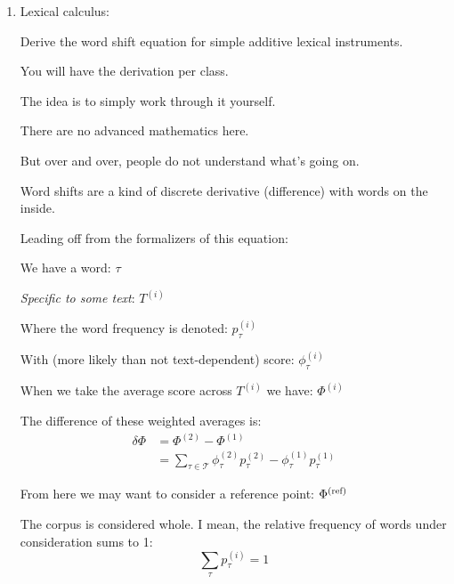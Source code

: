 \begin{enumerate}
(e):

For any \sout{non-isometric} general allometric scaling we will have more surface area per volume than our isometric counterparts.

Simply put:

$\gamma_3 \leq \frac{1}{3} \Rightarrow S \to$ bigger, faster. 

$\gamma_3 = \gamma_2 = \gamma_1 = \frac{1}{3}\Rightarrow S \to$  bigger, slowest.

$\gamma_3 =0 \Rightarrow S \to$ biggest, fastest. 
   
   \solutionend

  
\item

  Lexical calculus:

  Derive the word shift equation for simple additive lexical instruments.

  You will have the derivation per class.

  The idea is to simply work through it yourself.

  There are no advanced mathematics here.

  But over and over, people do not understand what's going on.

  Word shifts are a kind of discrete derivative (difference) with words on the inside.
  
   \solutionstart

   Leading off from the formalizers of this equation:
   
   We have a word: $\tau$ 
   
   \textit{Specific to some text}: $T^{(i)}$
   
   Where the word frequency is denoted: $p_\tau^{(i)}$

   With (more likely than not text-dependent) score: $\phi_{\tau}^{(i)}$

   When we take the average score across $T^{(i)}$ we have: $\Phi^{(i)}$

   The difference of these weighted averages is:
   \begin{align*}
      \delta \Phi &= \Phi^{(2)} - \Phi^{(1)}\\
      &= \sum_{\tau \in \mathcal{T}} \phi_{\tau}^{(2)}p_{\tau}^{(2)} - \phi_{\tau}^{(1)}p_{\tau}^{(1)}
   \end{align*}

   From here we may want to consider a reference point: $\Phi^{(\textnormal{ref})}$

   The corpus is considered whole. I mean, the relative frequency of words under consideration sums to 1:
   $$
   \sum_{\tau}p_{\tau}^{(i)}=1
   $$


\end{enumerate}
